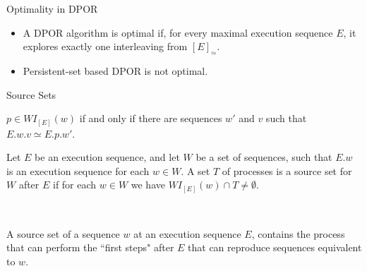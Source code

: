 \documentclass[9pt]{beamer}
\begin{document}
\begin{frame} {Optimality in DPOR}

\begin{itemize}[<+->]
\item A DPOR algorithm is optimal if, for every maximal execution sequence $E$, it explores exactly one interleaving from 
$[E]_{\simeq}$.
\item Persistent-set based DPOR is not optimal.
\end{itemize}
\end{frame}


\begin{frame}{Source Sets}



\begin{definition}

$p \in WI_{[E]}(w)$ if and only if there are sequences $w'$ and $v$ such
that $E.w.v \simeq E.p.w'$.

\end{definition}

\begin{definition}
Let $E$ be an execution sequence,
and let $W$ be a set of sequences, such that $E.w$ is an execution
sequence for each $w \in W$. A set $T$ of processes is a source set for
$W$ after $E$ if for each $w \in W$ we have $WI_{[E]}(w) \cap T  \neq \emptyset$.
\end{definition}
\\

\item A source set of a sequence $w$ at an execution sequence $E$, contains the process that can perform the  ``first steps" 
after $E$ that can reproduce sequences equivalent to $w$.

\end{frame}
\end{document}
